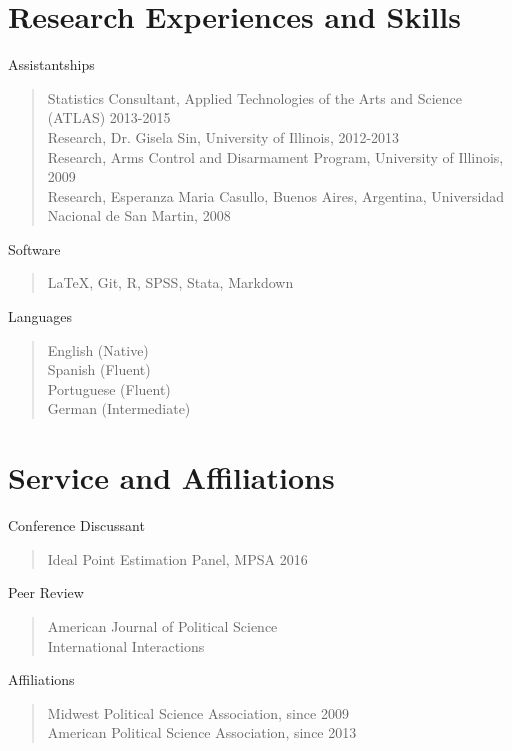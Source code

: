 \documentclass[margin, 10pt]{CVStyleTemplate}\usepackage[]{graphicx}\usepackage[]{color}
\begin{document}
\begin{resume}
\section{Research Experiences and Skills}

Assistantships
\begin{quotation}\noindent
Statistics Consultant, Applied Technologies of the Arts and Science (ATLAS) 2013-2015\\[6pt]%
Research, Dr. Gisela Sin, University of Illinois, 2012-2013\\[6pt]%
Research, Arms Control and Disarmament Program, University of Illinois, 2009\\[6pt]%
Research, Esperanza Maria Casullo, Buenos Aires, Argentina, Universidad Nacional de San Martin,  2008%
\end{quotation}
%

Software 
\begin{quotation} \noindent
\LaTeX, Git, R, SPSS, Stata, Markdown
\end{quotation}
%
Languages
\begin{quotation} \noindent
English (Native)\\
Spanish (Fluent)\\
Portuguese (Fluent)\\
German (Intermediate)
\end{quotation}
%
\section{Service and Affiliations}
Conference Discussant
\begin{quotation} \noindent
Ideal Point Estimation Panel, MPSA 2016 
\end{quotation}
%
Peer Review 
\begin{quotation} \noindent
American Journal of Political Science \\
International Interactions
\end{quotation}
%
Affiliations 
\begin{quotation} \noindent
Midwest Political Science Association, since 2009 \\%
American Political Science Association, since 2013 %
\end{quotation}
%

\end{resume}
\end{document}
